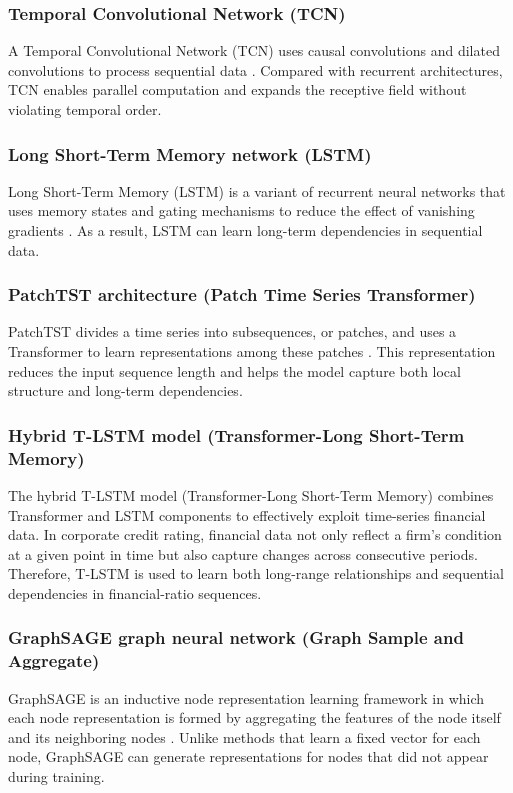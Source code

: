 \documentclass[10pt,twoside]{article}
\begin{document}
\subsubsection{Temporal Convolutional Network (TCN)}
A Temporal Convolutional Network (TCN) uses causal convolutions and dilated convolutions to process sequential data \cite{bai_empirical_2018}. Compared with recurrent architectures, TCN enables parallel computation and expands the receptive field without violating temporal order.

\subsubsection{Long Short-Term Memory network (LSTM)}
Long Short-Term Memory (LSTM) is a variant of recurrent neural networks that uses memory states and gating mechanisms to reduce the effect of vanishing gradients \cite{hochreiter_long_1997}. As a result, LSTM can learn long-term dependencies in sequential data.

\subsubsection{PatchTST architecture (Patch Time Series Transformer)}
PatchTST divides a time series into subsequences, or patches, and uses a Transformer to learn representations among these patches \cite{nie_time_2023}. This representation reduces the input sequence length and helps the model capture both local structure and long-term dependencies.

\subsubsection{Hybrid T-LSTM model (Transformer-Long Short-Term Memory)}
The hybrid T-LSTM model (Transformer-Long Short-Term Memory) \cite{kofune_enhancing_2026} combines Transformer and LSTM components to effectively exploit time-series financial data. In corporate credit rating, financial data not only reflect a firm's condition at a given point in time but also capture changes across consecutive periods. Therefore, T-LSTM is used to learn both long-range relationships and sequential dependencies in financial-ratio sequences.

\subsubsection{GraphSAGE graph neural network (Graph Sample and Aggregate)}
GraphSAGE is an inductive node representation learning framework in which each node representation is formed by aggregating the features of the node itself and its neighboring nodes \cite{hamilton_inductive_2018}. Unlike methods that learn a fixed vector for each node, GraphSAGE can generate representations for nodes that did not appear during training.
\end{document}
